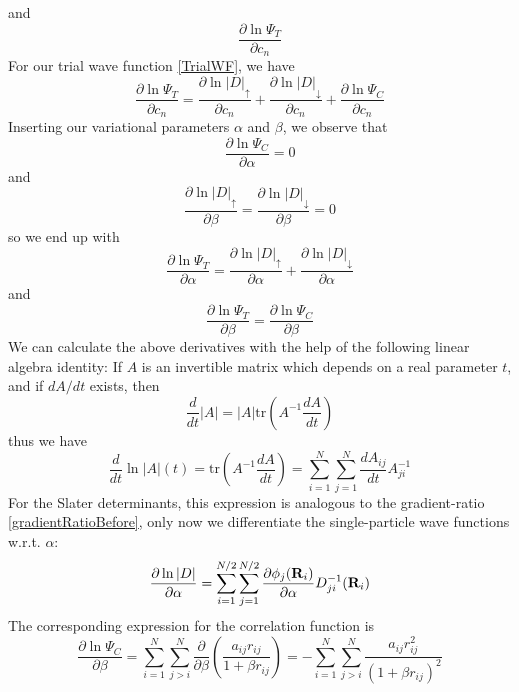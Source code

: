 \documentclass[english, a4paper]{article}
\begin{document}
and 
\begin{equation}
\frac{\partial \ln{\Psi_T}}{\partial c_n}
\end{equation}
For our trial wave function \eqref{TrialWF}, we have
\begin{equation}
 \frac{\partial\ln{\Psi_T}}{\partial c_n} = \frac{\partial\ln{|D|_\uparrow}}{\partial c_n} + 
 \frac{\partial\ln{|D|_\downarrow}}{\partial c_n} + \frac{\partial\ln{\Psi_C}}{\partial c_n}
\end{equation}
Inserting our variational parameters $\alpha$ and $\beta$, we observe that
\begin{equation}
 \frac{\partial\ln{\Psi_C}}{\partial \alpha} = 0
\end{equation}
and 
\begin{equation}
 \frac{\partial\ln{|D|_\uparrow}}{\partial \beta} = \frac{\partial\ln{|D|_\downarrow}}{\partial \beta} = 0
\end{equation}
so we end up with
\begin{equation}
 \frac{\partial\ln{\Psi_T}}{\partial \alpha} = \frac{\partial\ln{|D|_\uparrow}}{\partial \alpha} + 
 \frac{\partial\ln{|D|_\downarrow}}{\partial \alpha}
\end{equation}
and 
\begin{equation}
\frac{\partial\ln{\Psi_T}}{\partial \beta} = \frac{\partial\ln{\Psi_C}}{\partial \beta}
\end{equation}
We can calculate the above derivatives with the help of the following linear algebra identity:
If $A$ is an invertible matrix which depends on a real parameter $t$, and if $dA/dt$ exists, then
\begin{equation}
 \frac{d}{dt}|A| = |A|\textrm{tr}\left(A^{-1}\frac{dA}{dt}\right)
\end{equation}
thus we have
\begin{equation}
 \frac{d}{dt}\ln{|A|(t)} = \textrm{tr}\left(A^{-1}\frac{dA}{dt}\right) = 
 \sum_{i=1}^N\sum_{j=1}^N\frac{dA_{ij}}{dt}A_{ji}^{-1}
\end{equation}
For the Slater determinants, this expression is analogous to the gradient-ratio \eqref{gradientRatioBefore},
only now we differentiate the single-particle wave functions w.r.t. $\alpha$:
\begin{equation}
 \frac{\partial\ln{|D|}}{\partial \alpha} = 
 \sum_{i=1}^{N/2} \sum_{j=1}^{N/2} \frac{\partial \phi_j({\bf R}_i)}{\partial \alpha} D_{ji}^{-1}({\bf R}_i)
\end{equation}
The corresponding expression for the correlation function is
\begin{equation}
 \frac{\partial\ln{\Psi_C}}{\partial \beta} = 
 \sum_{i=1}^N\sum_{j>i}^N \frac{\partial}{\partial\beta}
 \left(\frac{a_{ij}r_{ij}}{1 + \beta r_{ij}}\right) = 
 -\sum_{i=1}^N\sum_{j>i}^N \frac{a_{ij}r_{ij}^2}{(1 + \beta r_{ij})^2}
\end{equation}
\end{document}
